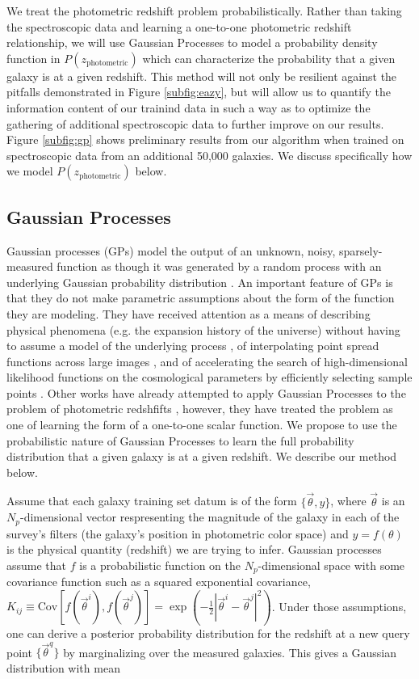 \documentclass[useAMS,usenatbib,tightenlines,11pt,preprint]{aastex}
\begin{document}
We treat the photometric redshift problem probabilistically.  Rather than
taking the spectroscopic data and learning a one-to-one photometric redshift
relationship, we will use Gaussian Processes to model a probability density
function in $P(z_\text{photometric})$ which can characterize the probability that a
given galaxy is at a given redshift.  This method will not only be resilient
against the pitfalls demonstrated in Figure \ref{subfig:eazy}, but will allow us
to quantify the information content of our trainind data in such a way as to
optimize the gathering of additional spectroscopic data to further improve on
our results.  
Figure \ref{subfig:gp} shows preliminary results from our
algorithm when trained on spectroscopic data from an 
additional 50,000 galaxies.
We discuss specifically how we model $P(z_\text{photometric})$ below.

\subsection{Gaussian Processes}
\label{sec:gppz}

Gaussian processes (GPs) model the output of an unknown, noisy,
sparsely-measured
function as though it was generated by a random process with an underlying
Gaussian probability distribution \cite{gp}.
An important feature of GPs is that they do not make parametric assumptions
about the form of the function they are modeling.  They have received
attention as a means of describing physical phenomena (e.g. the expansion
history of the universe) without having to assume a model of the underlying
process \cite{ericgp}, of interpolating point spread functions across large
images \cite{psf}, and of accelerating the search of high-dimensional
likelihood functions on the cosmological parameters by efficiently
selecting sample points \cite{daniel2012}.  
Other works have already attempted to apply Gaussian Processes to the problem of
photometric redshfifts \cite{kaufman,bonfield}, however, they have treated the
problem as one of learning the form of a one-to-one scalar function.  We propose
to use the probabilistic nature of Gaussian Processes to learn the full
probability distribution that a given galaxy is at a given redshift.  We
describe our method below.

Assume that each galaxy training set datum is of the form
$\{\vec{\theta},y\}$, where $\vec{\theta}$ is an $N_p$-dimensional vector
respresenting the magnitude of the galaxy in each of the survey's filters
(the galaxy's position in photometric color space) and $y = f(\theta)$ is
the physical quantity (redshift) we are trying to infer.  Gaussian
processes assume that $f$ is a probabilistic function on the
$N_p$-dimensional space with some covariance function such as a squared
exponential covariance,
$K_{ij}\equiv\text{Cov}\left[f(\vec{\theta}^{i}),f(\vec{\theta}^{j})\right]
= \exp(-\frac{1}{2}|\vec{\theta}^{i} - \vec{\theta}^{j}|^2)$.
Under those assumptions, one can derive a posterior probability distribution
for the redshift at a new query point $\{\vec{\theta}^{q}\}$ by marginalizing
over the measured galaxies.  This gives a Gaussian distribution with mean 
\end{document}
